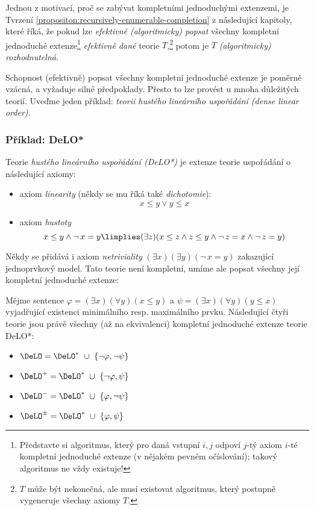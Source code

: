 \begin{remark}
    Jednou z motivací, proč se zabývat kompletními jednoduchými extenzemi, je Tvrzení \ref{propositon:recursively-enumerable-completion} z následující kapitoly, které říká, že pokud lze \emph{efektivně (algoritmicky) popsat} všechny kompletní jednoduché extenze\footnote{Představte si algoritmus, který pro daná vstupní $i,j$ odpoví $j$-tý axiom $i$-té kompletní jednoduché extenze (v nějakém pevném očíslování); takový algoritmus ne vždy existuje!} \emph{efektivně dané} teorie $T$,\footnote{$T$ může být nekonečná, ale musí existovat algoritmus, který postupně vygeneruje všechny axiomy $T$.} potom je $T$ \emph{(algoritmicky) rozhodnutelná}.
\end{remark}


Schopnost (efektivně) popsat všechny kompletní jednoduché extenze je poměrně vzácná, a vyžaduje silné předpoklady. Přesto to lze provést u mnoha důležitých teorií. Uveďme jeden příklad: \emph{teorii hustého lineárního uspořádání (dense linear order)}.

\subsubsection{Příklad: DeLO*}

Teorie \emph{hustého lineárního uspořádání (DeLO*)}  je extenze teorie uspořádání o následující axiomy: 
\begin{itemize}
    \item axiom \emph{linearity} (někdy se mu říká také \emph{dichotomie}):
    $$
    x\leq y\lor y\leq x
    $$
    \item axiom \emph{hustoty}
    $$
    {x\leq y}\land{\neg\,x=y}\limplies(\exists z)(x\leq z\land z\leq y\land\neg\,z=x\land\neg\,z=y)
    $$
\end{itemize}
Někdy se přidává i axiom \emph{netriviality} $(\exists x)(\exists y)(\neg\,x=y)$ zakazující jednoprvkový model. Tato teorie není kompletní, umíme ale popsat všechny její kompletní jednoduché extenze:

\begin{proposition}
Mějme sentence $\varphi=(\exists x)(\forall y)(x\leq y)$ a $\psi=(\exists x)(\forall y)(y\leq x)$ vyjadřující existenci minimálního resp. maximálního prvku. Následující čtyři teorie jsou právě všechny (až na ekvivalenci) kompletní jednoduché extenze teorie DeLO*:
\begin{itemize}
    \item $\DeLO = \DeLO^*\ \cup \ \{\neg\varphi
    ,\neg\psi\}$
    \item $\DeLO^+ = \DeLO^*\ \cup \ \{\neg\varphi
    ,\psi\}$
    \item $\DeLO^- = \DeLO^*\ \cup \ \{\varphi
    ,\neg\psi\}$
    \item $\DeLO^\pm = \DeLO^*\ \cup \ \{\varphi
    ,\psi\}$        
\end{itemize}
\end{proposition}

